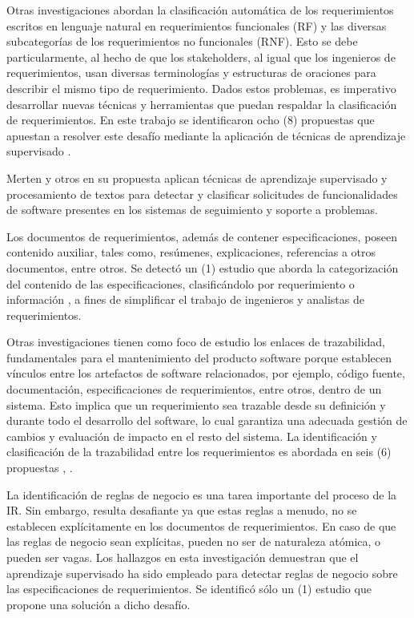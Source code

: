 \documentclass[journal]{IEEEtran}
\begin{document}
Otras investigaciones abordan la clasificación automática de los requerimientos escritos en lenguaje natural en requerimientos funcionales (RF) y las diversas subcategorías de los requerimientos no funcionales (RNF). Esto se debe particularmente, al hecho de que los stakeholders, al igual que los ingenieros de requerimientos, usan diversas terminologías y estructuras de oraciones para describir el mismo tipo de requerimiento. Dados estos problemas, es imperativo desarrollar nuevas técnicas y herramientas que puedan respaldar la clasificación de requerimientos. En este trabajo se identificaron ocho (8) propuestas que apuestan a resolver este desafío mediante la aplicación de técnicas de aprendizaje supervisado \cite{li2017identifying,Jindal20162027,kurtanovic2017automatically,dekhtyar2017re,abad2017works,Slankas2013,Slankas2013a}.

Merten y otros \cite{Merten2016} en su propuesta aplican técnicas de aprendizaje supervisado y procesamiento de textos para detectar y clasificar solicitudes de funcionalidades de software presentes en los sistemas de seguimiento y soporte a problemas.

Los documentos de requerimientos, además de contener especificaciones, poseen contenido auxiliar, tales como, resúmenes, explicaciones, referencias a otros documentos, entre otros. Se detectó un (1) estudio que aborda la categorización del contenido de las especificaciones, clasificándolo por requerimiento o información \cite{winkler2016automatic}, a fines de simplificar el trabajo de ingenieros y analistas de requerimientos.

Otras investigaciones tienen como foco de estudio los enlaces de trazabilidad, fundamentales para el mantenimiento del producto software porque establecen vínculos entre los artefactos de software relacionados, por ejemplo, código fuente, documentación, especificaciones de requerimientos, entre otros, dentro de un sistema. Esto implica que un requerimiento sea trazable desde su definición y durante todo el desarrollo del software, lo cual garantiza una adecuada gestión de cambios y evaluación de impacto en el resto del sistema. La identificación y clasificación de la trazabilidad entre los requerimientos es abordada en seis (6) propuestas \cite{Li201725}, \cite{Cleland-Huang2010,gokyer2008non,Mills2017,Sardinha2013,AtasM.2018}.

La identificación de reglas de negocio es una tarea importante del proceso de la IR. Sin embargo, resulta desafiante ya que estas reglas a menudo, no se establecen explícitamente en los documentos de requerimientos. En caso de que las reglas de negocio sean explícitas, pueden no ser de naturaleza atómica, o pueden ser vagas. Los hallazgos en esta investigación demuestran que el aprendizaje supervisado ha sido empleado para detectar reglas de negocio sobre las especificaciones de requerimientos\cite{sharma2014automated}. Se identificó sólo un (1) estudio que propone una solución a dicho desafío.
\end{document}
